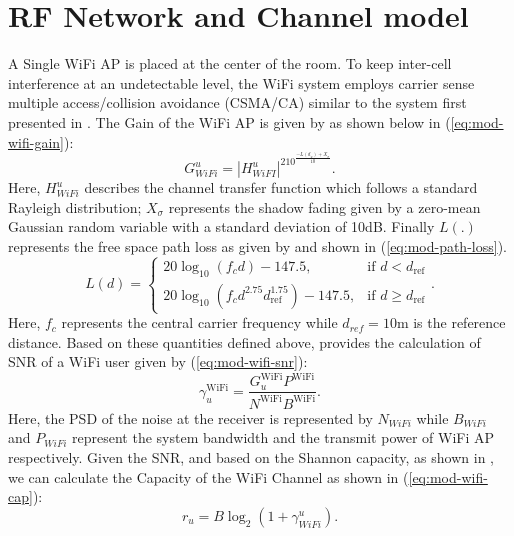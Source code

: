 \section{RF Network and Channel model}
A Single WiFi AP is placed at the center of the room. To keep inter-cell interference at an undetectable level, the WiFi system employs carrier sense multiple access/collision avoidance (CSMA/CA) similar to the system first presented in \cite{wu_novel_2020-1}.
The Gain of the WiFi AP is given by \cite{perahia_next_2013} as shown below in (\ref{eq:mod-wifi-gain}):
\begin{equation}
    G_{WiFi}^u = |H_{WiFI}^u|^210^{\frac{-L(d_u) + X_\sigma}{10}}.
    \label{eq:mod-wifi-gain}
\end{equation}
Here, $H_{WiFi}^u$ describes the channel transfer function which follows a standard Rayleigh distribution; $X_\sigma$ represents the shadow fading given by a zero-mean Gaussian random variable with a standard deviation of 10dB. Finally $L(.)$ represents the free space path loss as given by \cite{wu_mobility_2018} and shown in (\ref{eq:mod-path-loss}).
\begin{equation}
    L(d) = 
\begin{cases} 
20 \log_{10}(f_c d) - 147.5, & \text{if } d < d_{\text{ref}} \\
20 \log_{10}(f_c d^{2.75} d_{\text{ref}}^{1.75}) - 147.5, & \text{if } d \geq d_{\text{ref}}
\end{cases}.
\label{eq:mod-path-loss}
\end{equation}
Here, $f_c$ represents the central carrier frequency while $d_{ref} = 10 \text{m}$ is the reference distance. Based on these quantities defined above, \cite{wu_mobility_2018} provides the calculation of SNR of a WiFi user given by (\ref{eq:mod-wifi-snr}):
\begin{equation}
    \gamma_{u}^{\text{WiFi}} = \frac{G_{u}^{\text{WiFi}} P^{\text{WiFi}}}{N^{\text{WiFi}} B^{\text{WiFi}}} .
    \label{eq:mod-wifi-snr}
\end{equation}
Here, the PSD of the noise at the receiver is represented by $N_{WiFi}$ while $B_{WiFi}$ and $P_{WiFi}$ represent the system bandwidth and the transmit power of WiFi AP respectively. Given the SNR, and based on the Shannon capacity, as shown in \cite{wu_novel_2020-1}, we can calculate the Capacity of the WiFi Channel as shown in (\ref{eq:mod-wifi-cap}):
\begin{equation}
    r_u = B \log_2(1 + \gamma_{WiFi}^u).
    \label{eq:mod-wifi-cap}
\end{equation}

